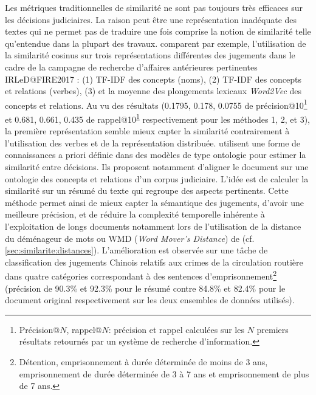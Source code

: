 Les métriques traditionnelles de similarité ne sont pas toujours très efficaces sur les décisions judiciaires. La raison peut être une représentation inadéquate des textes qui ne permet pas de traduire une fois comprise la notion de similarité telle qu'entendue dans la plupart des travaux. \citet{thenmozhi2017legalprecedretriev} comparent par exemple, l'utilisation de la similarité cosinus sur trois représentations différentes des jugements dans le cadre de la campagne de recherche d'affaires antérieures pertinentes  IRLeD@FIRE2017 \citep{mandal2017IRLeD@FIRE2017}: (1) TF-IDF des concepts (noms), (2) TF-IDF des concepts et relations (verbes), (3) et la moyenne des plongements lexicaux \textit{Word2Vec} \citep{mikolov2013word2vec} des concepts et relations. Au vu des résultats (0.1795, 0.178, 0.0755 de précision@10\footnote{\label{footnote:literature:PR_at_N} Précision@$N$, rappel@$N$: précision et rappel calculées sur les $N$ premiers résultats retournés par un système de recherche d'information.} et 0.681, 0.661, 0.435 de rappel@10\textsuperscript{\ref{footnote:literature:PR_at_N}} respectivement pour les méthodes 1, 2, et 3), la première représentation semble mieux capter la similarité contrairement à l'utilisation des verbes et de la représentation distribuée.  %
 \citet{ma2018wmdchinesecase} utilisent une forme de connaissances a priori définie dans des modèles de type ontologie pour estimer la similarité entre décisions. Ils proposent notamment d'aligner le document sur une ontologie des concepts et relations d'un corpus judiciaire. L'idée est de calculer la similarité sur un résumé du texte qui regroupe des aspects pertinents. Cette méthode permet ainsi de mieux capter la sémantique des jugements, d'avoir une meilleure précision, et de réduire la complexité temporelle inhérente à l'exploitation de longs documents notamment lors de l'utilisation de la \og distance du déménageur de mots \fg{} ou WMD (\textit{Word Mover's Distance}) de \citet{kusner2015wordmoverdist} (cf. \ref{sec:similarite:distances}). L'amélioration est observée sur une tâche de classification des jugements Chinois relatifs aux crimes de la circulation routière dans quatre catégories correspondant à des sentences d'emprisonnement\footnote{Détention, emprisonnement à durée déterminée de moins de 3 ans, emprisonnement de durée déterminée de 3 à 7 ans et emprisonnement de plus de 7 ans.} (précision de 90.3\% et 92.3\% pour le résumé contre 84.8\% et 82.4\% pour le document original respectivement sur les deux ensembles de données utilisés). 

